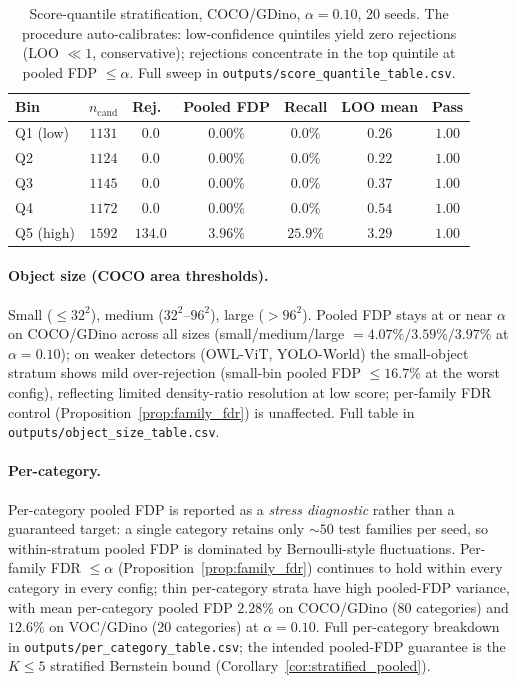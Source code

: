 \documentclass{article}
\theoremstyle{remark}
\newcommand{\1}{\mathbf{1}}
\begin{document}
\begin{table}[h]
\centering
\small
\begin{tabular*}{\linewidth}{@{\extracolsep{\fill}}lcccccc@{}}
\toprule
Bin & $n_{\mathrm{cand}}$ & Rej.\ & Pooled FDP & Recall & LOO mean & Pass \\
\midrule
Q1 (low)  & $1131$ & $0.0$   & $0.00\%$ & $0.0\%$  & $0.26$ & $1.00$ \\
Q2        & $1124$ & $0.0$   & $0.00\%$ & $0.0\%$  & $0.22$ & $1.00$ \\
Q3        & $1145$ & $0.0$   & $0.00\%$ & $0.0\%$  & $0.37$ & $1.00$ \\
Q4        & $1172$ & $0.0$   & $0.00\%$ & $0.0\%$  & $0.54$ & $1.00$ \\
Q5 (high) & $1592$ & $134.0$ & $3.96\%$ & $25.9\%$ & $3.29$ & $1.00$ \\
\bottomrule
\end{tabular*}
\caption{Score-quantile stratification, COCO/GDino, $\alpha\!=\!0.10$,
20 seeds. The procedure auto-calibrates: low-confidence quintiles
yield zero rejections (LOO $\ll 1$, conservative); rejections concentrate
in the top quintile at pooled FDP $\le\alpha$.
Full sweep in \texttt{outputs/score\_quantile\_table.csv}.}
\label{tab:score_quantile}
\end{table}

\paragraph{Object size (COCO area thresholds).}
Small ($\le 32^2$), medium ($32^2$--$96^2$), large ($>96^2$).
Pooled FDP stays at or near $\alpha$ on COCO/GDino across all sizes
(small/medium/large $= 4.07\%/3.59\%/3.97\%$ at $\alpha\!=\!0.10$);
on weaker detectors (OWL-ViT, YOLO-World) the small-object stratum
shows mild over-rejection (small-bin pooled FDP $\le 16.7\%$ at the
worst config), reflecting limited density-ratio resolution at low
score; per-family FDR control (Proposition~\ref{prop:family_fdr}) is
unaffected. Full table in
\texttt{outputs/object\_size\_table.csv}.

\paragraph{Per-category.}
Per-category pooled FDP is reported as a \emph{stress diagnostic}
rather than a guaranteed target: a single category retains only
$\sim 50$ test families per seed, so within-stratum pooled FDP is
dominated by Bernoulli-style fluctuations. Per-family FDR
$\le\alpha$ (Proposition~\ref{prop:family_fdr}) continues to hold
within every category in every config; thin per-category strata
have high pooled-FDP variance, with mean per-category pooled FDP
$2.28\%$ on COCO/GDino (80 categories) and $12.6\%$ on VOC/GDino
(20 categories) at $\alpha\!=\!0.10$. Full per-category
breakdown in \texttt{outputs/per\_category\_table.csv}; the
intended pooled-FDP guarantee is the $K\!\le\!5$ stratified
Bernstein bound (Corollary~\ref{cor:stratified_pooled}).
\end{document}
